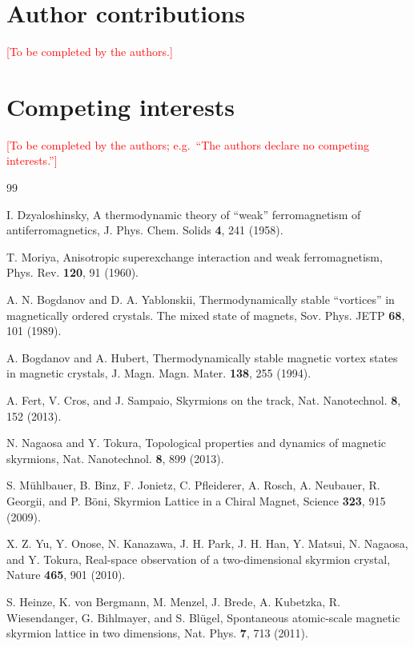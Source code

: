 \documentclass[aps,prb,preprint,superscriptaddress,longbibliography,nofootinbib]{revtex4-2}
\begin{document}
\section*{Author contributions}

\textcolor{red}{[To be completed by the authors.]}

\section*{Competing interests}

\textcolor{red}{[To be completed by the authors; e.g.\ ``The authors declare no competing interests.'']}

\begin{thebibliography}{99}

 I. Dzyaloshinsky, A thermodynamic theory of ``weak'' ferromagnetism of
antiferromagnetics, J. Phys. Chem. Solids \textbf{4}, 241 (1958).

 T. Moriya, Anisotropic superexchange interaction and weak ferromagnetism, Phys. Rev.
\textbf{120}, 91 (1960).

 A. N. Bogdanov and D. A. Yablonskii, Thermodynamically stable ``vortices'' in magnetically ordered crystals. The mixed state of magnets, Sov. Phys. JETP \textbf{68}, 101 (1989).

 A. Bogdanov and A. Hubert, Thermodynamically stable magnetic vortex states in magnetic crystals, J. Magn. Magn. Mater. \textbf{138}, 255 (1994).

 A. Fert, V. Cros, and J. Sampaio, Skyrmions on the track, Nat. Nanotechnol. \textbf{8},
152 (2013).

 N. Nagaosa and Y. Tokura, Topological properties and dynamics of magnetic skyrmions,
Nat. Nanotechnol. \textbf{8}, 899 (2013).

 S. M\"uhlbauer, B. Binz, F. Jonietz, C. Pfleiderer, A. Rosch, A. Neubauer, R. Georgii, and P. B\"oni, Skyrmion Lattice in a Chiral Magnet, Science \textbf{323}, 915 (2009).

 X. Z. Yu, Y. Onose, N. Kanazawa, J. H. Park, J. H. Han, Y. Matsui, N. Nagaosa, and Y. Tokura, Real-space observation of a two-dimensional skyrmion crystal, Nature \textbf{465}, 901 (2010).

 S. Heinze, K. von Bergmann, M. Menzel, J. Brede, A. Kubetzka, R. Wiesendanger, G. Bihlmayer, and S. Bl\"ugel, Spontaneous atomic-scale magnetic skyrmion lattice in two dimensions, Nat. Phys. \textbf{7}, 713 (2011).


\end{thebibliography}
\end{document}
